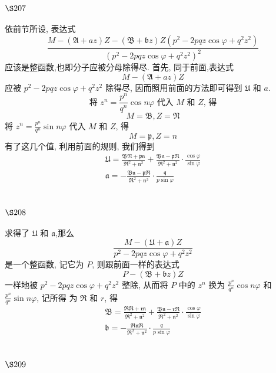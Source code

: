 \section{$\S 207$}

依前节所设, 表达式
\[
\frac{M-(\mathfrak{A}+a z) Z-(\mathfrak{B}+\mathfrak{b} z) Z\left(p^{2}-2 p q z \cos \varphi+q^{2} z^{2}\right)}{\left(p^{2}-2 p q z \cos \varphi+q^{2} z^{2}\right)^{2}}
\]
应该是整函数,也即分子应被分母除得尽. 首先, 同于前面,表达式
\[
M-(\mathfrak{A}+a z) Z
\]
应被 $p^{2}-2 p q z \cos \varphi+q^{2} z^{2}$ 除得尽, 因而照用前面的方法即可得到 $\mathfrak{U}$ 和 $a$.
\[
\text { 将 } z^{n}=\frac{p^{n}}{q^{n}} \cos n \varphi \text { 代入 } M \text { 和 } Z \text {, 得 }
\]
\[
M=\mathfrak{B}, Z=\mathfrak{N}
\]
将 $z^{n}=\frac{p^{n}}{q^{n}} \sin n \varphi$ 代入 $M$ 和 $Z$, 得
\[
M=\mathfrak{p}, Z=n
\]
有了这几个值, 利用前面的规则, 我们得到
\[
\begin{gathered}
\mathfrak{U}=\frac{\mathfrak{B} \mathfrak{N}+\mathfrak{p} \mathfrak{n}}{\mathfrak{R}^{2}+\mathfrak{n}^{2}}+\frac{\mathfrak{B} \mathfrak{n}-\mathfrak{p} \mathfrak{R}}{\mathfrak{R}^{2}+\mathfrak{n}^{2}} \cdot \frac{\cos \varphi}{\sin \varphi} \\
\mathfrak{a}=-\frac{\mathfrak{B} \mathfrak{n}-\mathfrak{p} \mathfrak{R}}{\mathfrak{R}^{2}+\mathfrak{n}^{2}} \cdot \frac{\mathfrak{q}}{p \sin \varphi}
\end{gathered}
\]
\section{$\S 208$}

求得了 $\mathfrak{U}$ 和 $\mathfrak{a}$,那么
\[
\frac{M-(\mathfrak{U}+\mathfrak{a}) Z}{p^{2}-2 p q z \cos \varphi+q^{2} z^{2}}
\]
是一个整函数, 记它为 $P$, 则跟前面一样的表达式
\[
P-(\mathfrak{B}+\mathfrak{b} z) Z
\]
一样地被 $p^{2}-2 p q z \cos \varphi+q^{2} z^{2}$ 整除, 从而将 $P$ 中的 $z^{n}$ 换为 $\frac{p^{n}}{q^{n}} \cos n \varphi$ 和 $\frac{p^{n}}{q^{n}} \sin n \varphi$, 记所得 为 $\mathfrak{R}$ 和 $r$, 得
\[
\begin{gathered}
\mathfrak{B}=\frac{\mathfrak{R} \mathfrak{R}+\mathfrak{r} \mathfrak{n}}{\mathfrak{R}^{2}+\mathfrak{n}^{2}}+\frac{\mathfrak{B} \mathfrak{n}-\mathfrak{r} \mathfrak{R}}{\mathfrak{R}^{2}+\mathfrak{n}^{2}} \cdot \frac{\cos \varphi}{\sin \varphi} \\
\mathfrak{b}=-\frac{\mathfrak{R} \mathfrak{n} \mathfrak{R}}{\mathfrak{R}^{2}+\mathfrak{n}^{2}} \cdot \frac{q}{p \sin \varphi}
\end{gathered}
\]
\section{$\S 209$}

